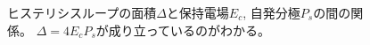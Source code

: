 \documentclass[9pt,dvipdfmx,a4paper]{jsarticle}
\begin{document}
\begin{figure}[H]
\begin{minipage}[t]{0.48\columnwidth}
        \caption{\small{ヒステリシスループの面積\(\Delta\)と保持電場\(E_c\), 自発分極\(P_s\)の間の関係。
        \(\Delta=4E_cP_s\)が成り立っているのがわかる。}}
        \label{graph:TGS_Delta-E}
    \end{minipage}
\end{figure}

\end{document}

